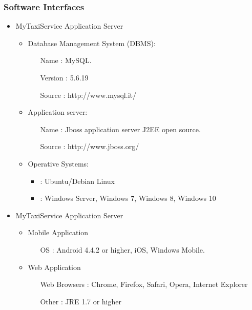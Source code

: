 \documentclass[11pt, a4paper,titlepage]{article}
\newcommand{\productname}{MyTaxiService }
\begin{document}
\subsubsection{Software Interfaces}
\begin{itemize}
	\item \productname Application Server
		\begin{itemize}
			\item Database Management System (DBMS):
			\begin{itemize}
				\item[Name]: MySQL.
				\item[Version]:  5.6.19
				\item[Source]: http://www.mysql.it/
			\end{itemize}
			\item Application server:
			\begin{itemize}
				\item[Name]:  Jboss application server J2EE open source.
				\item[Source]: http://www.jboss.org/
			\end{itemize}
			\item Operative Systems:
			\begin{itemize}
				\item: Ubuntu/Debian Linux
				\item: Windows Server, Windows 7, Windows 8, Windows 10
			\end{itemize}
		\end{itemize}
		
	\item \productname Application Server
	\begin{itemize}
		\item Mobile Application
		\begin{itemize}
			\item[OS]: Android 4.4.2 or higher, iOS, Windows Mobile.
		\end{itemize}
	\end{itemize}
	\begin{itemize}
		\item Web Application
		\begin{itemize}
			\item[Web Browsers]: Chrome, Firefox, Safari, Opera, Internet Explorer
			\item[Other]: JRE 1.7 or higher
		\end{itemize}
	\end{itemize}	
\end{itemize}
\end{document}
